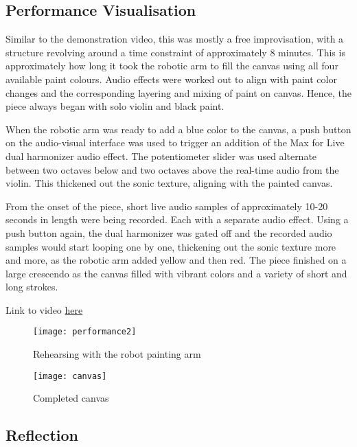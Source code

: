 \documentclass{nime-alternate}
\begin{document}
\subsection{Performance Visualisation}

Similar to the demonstration video, this was mostly a free improvisation, with a structure revolving around a time constraint of approximately 8 minutes. This is approximately how long it took the robotic arm to fill the canvas using all four available paint colours. Audio effects were worked out to align with paint color changes and the corresponding layering and mixing of paint on canvas. Hence, the piece always began with solo violin and black paint. 

When the robotic arm was ready to add a blue color to the canvas, a push button on the audio-visual interface was used to trigger an addition of the Max for Live dual harmonizer audio effect. The potentiometer slider was used alternate between two octaves below and two octaves above the real-time audio from the violin. This thickened out the sonic texture, aligning with the painted canvas. 

From the onset of the piece, short live audio samples of approximately 10-20 seconds in length were being recorded. Each with a separate audio effect. Using a push button again, the dual harmonizer was gated off and the recorded audio samples would start looping one by one, thickening out the sonic texture more and more, as the robotic arm added yellow and then red. The piece finished on a large crescendo as the canvas filled with vibrant colors and a variety of short and long strokes\cite{savery:robotic}.

Link to video \href{https://www.dropbox.com/s/fu38a4jx1ph0x9t/Tesseract%20POC.mp4?dl=0}{here}

\begin{figure}[t]
	\centering
		\texttt{[image: performance2]}
	\caption{Rehearsing with the robot painting arm}
	\label{fig:performance2}
\end{figure}
\begin{figure}[t]
	\centering
		\texttt{[image: canvas]}
	\caption{Completed canvas}
	\label{fig:canvas}
\end{figure}

\subsection{Reflection}
\end{document}

